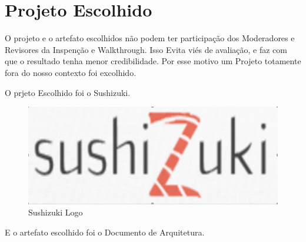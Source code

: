 \chapter{Projeto Escolhido}

O projeto e o artefato escolhidos não podem ter participação dos Moderadores e Revisores da Inspenção e Walkthrough.
Isso Evita viés de avaliação, e faz com que o resultado tenha menor credibilidade. Por esse motivo um Projeto totamente fora 
do nosso contexto foi excolhido.

O prjeto Escolhido foi o Sushizuki.


\begin{figure}[H]
  \center
  \includegraphics[width=1\textwidth]{figuras/sushizuki.png}
  \caption{Sushizuki Logo}
  \label{fig:sushizuki}
\end{figure}

E o artefato escolhido foi o Documento de Arquitetura.
